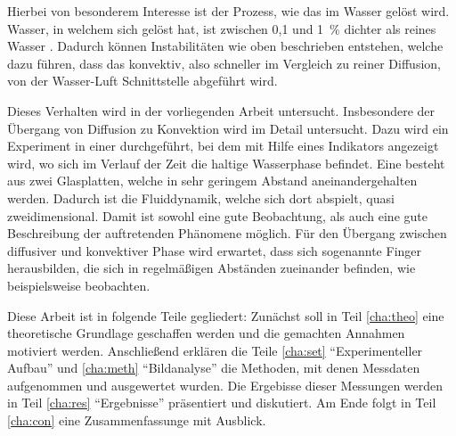 Hierbei von besonderem Interesse ist der Prozess, wie das \COT im Wasser gelöst wird.
Wasser, in welchem sich \COT gelöst hat, ist zwischen 0,1 und \SI{1}{\percent} dichter als reines Wasser \citep{garcia}. Dadurch können Instabilitäten wie oben beschrieben entstehen, welche dazu führen, dass das \COT konvektiv, also schneller im Vergleich zu reiner Diffusion, von der Wasser-Luft Schnittstelle abgeführt wird.

Dieses Verhalten wird in der vorliegenden Arbeit untersucht. Insbesondere der Übergang von Diffusion zu Konvektion wird im Detail untersucht.
Dazu wird ein Experiment in einer \HSC durchgeführt, bei dem mit Hilfe eines Indikators angezeigt wird, wo sich im Verlauf der Zeit die \COTm haltige Wasserphase befindet. 
Eine \HSC besteht aus zwei Glasplatten, welche in sehr geringem Abstand aneinandergehalten werden. Dadurch ist die Fluiddynamik, welche sich dort abspielt, quasi zweidimensional. Damit ist sowohl eine gute Beobachtung, als auch eine gute Beschreibung der auftretenden Phänomene möglich.
Für den Übergang zwischen diffusiver und konvektiver Phase wird erwartet, dass sich sogenannte Finger herausbilden, die sich in regelmäßigen Abständen zueinander befinden, wie beispielsweise \cite{fernandez} beobachten.

Diese Arbeit ist in folgende Teile gegliedert: Zunächst soll in Teil \ref{cha:theo} eine theoretische Grundlage geschaffen werden und die gemachten Annahmen motiviert werden. Anschließend erklären die Teile \ref{cha:set} "`Experimenteller Aufbau"' und \ref{cha:meth} "`Bildanalyse"' die Methoden, mit denen Messdaten aufgenommen und ausgewertet wurden. Die Ergebisse dieser Messungen werden in Teil \ref{cha:res} "`Ergebnisse"' präsentiert und diskutiert. Am Ende folgt in Teil \ref{cha:con} eine Zusammenfassunge mit Ausblick.


